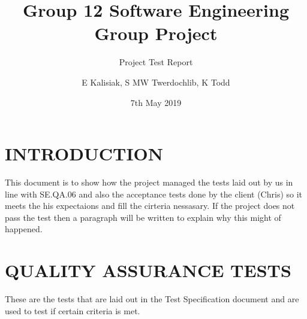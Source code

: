 \documentclass{project}
\begin{document}
\title{Group 12 Software Engineering Group Project}
\subtitle{Project Test Report}
\author{E Kalisiak, S MW Twerdochlib, K Todd}     
\date{7th May 2019}
\maketitle
\raggedbottom
\tableofcontents
\newpage
\section{INTRODUCTION}
This document is to show how the project managed the tests laid out by us in line with SE.QA.06 and also the acceptance tests done by the client (Chris) so it meets the his expectaions and fill the cirteria nessasary. If the project does not pass the test then a paragraph will be written to explain why this might of happened. 

\section{QUALITY ASSURANCE TESTS}
These are the tests that are laid out in the Test Specification document and are used to test if certain criteria is met. 
\end{document}
